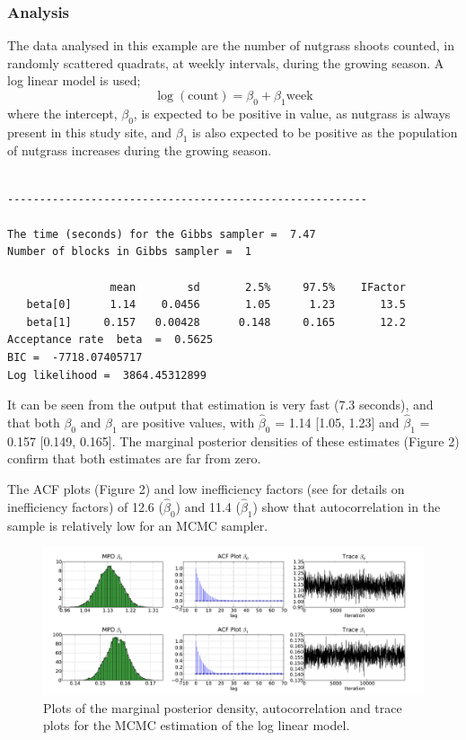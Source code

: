 \documentclass[article]{jss}
\begin{document}
\subsubsection{Analysis}

The data analysed in this example are the number of nutgrass shoots
counted, in randomly scattered quadrats, at weekly intervals, during
the growing season. A log linear model is used; \begin{equation}
  \log(\mbox{count})=\beta_{0}+\beta_{1}\mbox{week}\end{equation}
where the intercept, $\beta_{0}$, is expected to be positive in value,
as nutgrass is always present in this study site, and $\beta_{1}$ is also expected to be
positive as the population of nutgrass increases during the growing
season.

\begin{verbatim}

--------------------------------------------------------

The time (seconds) for the Gibbs sampler =  7.47
Number of blocks in Gibbs sampler =  1

                mean        sd       2.5%     97.5%    IFactor
   beta[0]      1.14    0.0456       1.05      1.23       13.5
   beta[1]     0.157   0.00428      0.148     0.165       12.2
Acceptance rate  beta  =  0.5625
BIC =  -7718.07405717
Log likelihood =  3864.45312899

\end{verbatim}

It can be seen from the output that estimation is very fast (7.3
seconds), and that both $\beta_{0}$ and $\beta_{1}$ are positive
values, with $\hat{\beta}_{0}$ = 1.14 {[}1.05, 1.23{]} and
$\hat{\beta}_{1}$ = 0.157 {[}0.149, 0.165{]}. The marginal posterior
densities of these estimates (Figure 2) confirm that both estimates
are far from zero.

The ACF plots (Figure 2) and low inefficiency factors (see \citet{ChibGreenberg1996} for details on
inefficiency factors) of 12.6
($\hat{\beta}_{0}$) and 11.4 ($\hat{\beta}_{1}$) show that
autocorrelation in the sample is relatively low for an MCMC sampler. %
\begin{figure}
  \begin{center}
    \includegraphics[width=16cm]{ex_loglinear.pdf}
  \end{center}
\caption{Plots of the marginal posterior density, autocorrelation and trace
plots for the MCMC estimation of the log linear model.}

\end{figure}
\end{document}
